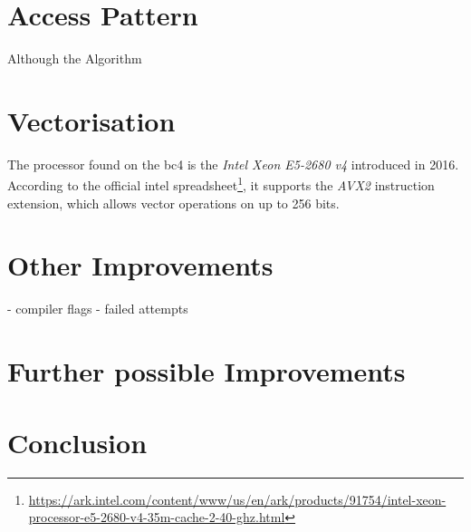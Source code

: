\documentclass[letterpaper,twocolumn,10pt]{article}
\begin{document}
\section*{Access Pattern}
Although the Algorithm

\section*{Vectorisation}
The processor found on the bc4 is the \textit{Intel Xeon E5-2680 v4} introduced in 2016.
According to the official intel spreadsheet\footnote{\url{https://ark.intel.com/content/www/us/en/ark/products/91754/intel-xeon-processor-e5-2680-v4-35m-cache-2-40-ghz.html}},
it supports the \textit{AVX2} instruction extension, which allows vector operations on up to 256 bits.

\section*{Other Improvements}
- compiler flags
- failed attempts

\section*{Further possible Improvements}

\section*{Conclusion}




\end{document}
